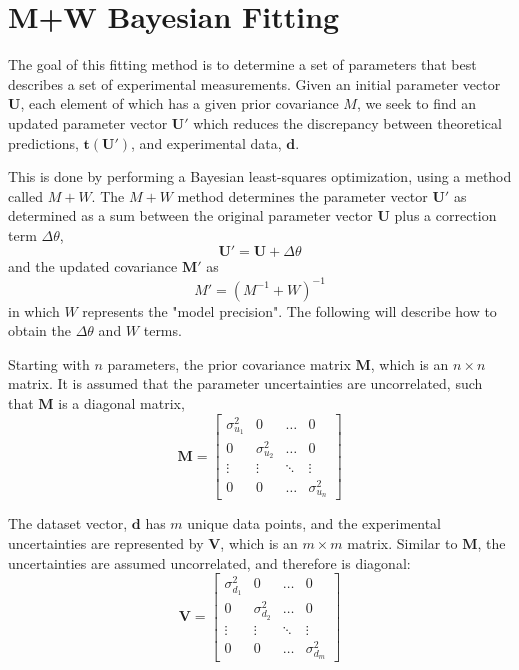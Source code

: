 \section{M+W Bayesian Fitting}

The goal of this fitting method is to determine a set of parameters that best describes a set of experimental measurements. Given an initial parameter vector $\mathbf{U}$, each element of which has a given prior covariance $M$, we seek to find an updated parameter vector $\mathbf{U}'$ which reduces the discrepancy between theoretical predictions, $\mathbf{t}(\mathbf{U}')$, and experimental data, $\mathbf{d}$.

This is done by performing a Bayesian least-squares optimization, using a method called $M+W$. The $M+W$ method determines the parameter vector $\mathbf{U}'$ as determined as a sum between the original parameter vector $\mathbf{U}$ plus a correction term $\Delta \theta$,
\begin{equation}
    \mathbf{U}' = \mathbf{U} + \Delta \theta
\end{equation}
and the updated covariance $\mathbf{M}'$ as
\begin{equation}
    M' = \left(M^{-1} + W\right)^{-1}
\end{equation}
in which $W$ represents the "model precision". The following will describe how to obtain the $\Delta \theta$ and $W$ terms.

Starting with $n$ parameters, the prior covariance matrix $\mathbf{M}$, which is an $n\times n$ matrix. It is assumed that the parameter uncertainties are uncorrelated, such that $\mathbf{M}$ is a diagonal matrix,
\begin{equation}
    \mathbf{M} = 
\begin{bmatrix}
\sigma_{u_1}^2 & 0 & \dots & 0 \\
0 & \sigma_{u_2}^2 & \dots & 0 \\
\vdots & \vdots & \ddots & \vdots \\
0 & 0 & \dots & \sigma_{u_n}^2
\end{bmatrix}
\end{equation}

The dataset vector, $\mathbf{d}$ has $m$ unique data points, and the experimental uncertainties are represented by $\mathbf{V}$, which is an $m \times m$ matrix. Similar to $\mathbf{M}$, the uncertainties are assumed uncorrelated, and therefore is diagonal:
\begin{equation}
    \mathbf{V} = 
\begin{bmatrix}
\sigma_{d_1}^2 & 0 & \dots & 0 \\
0 & \sigma_{d_2}^2 & \dots & 0 \\
\vdots & \vdots & \ddots & \vdots \\
0 & 0 & \dots & \sigma_{d_m}^2
\end{bmatrix}
\end{equation}

